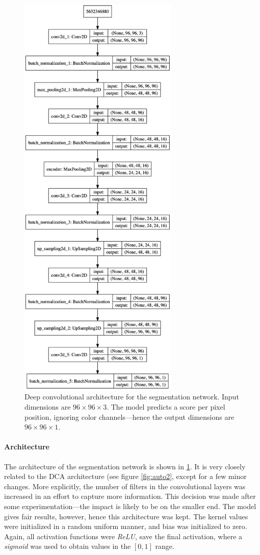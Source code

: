\begin{figure}[!htbp]
  \begin{center}
    \includegraphics[height=20cm, keepaspectratio]{images/segm_architecture}
    \caption{Deep convolutional architecture for the segmentation network. Input dimensions are $96 \times 96 \times 3$. The model predicts a score per pixel position, ignoring color channels---hence the output dimensions are $96 \times 96 \times 1$.}
    \label{fig:segm_architecture}
  \end{center}
\end{figure}

\paragraph{Architecture} The architecture of the segmentation network is shown in \ref{fig:segm_architecture}. It is very closely related to the DCA architecture (see figure \textcolor{blue}{\ref{fig:auto2}}, except for a few minor changes. More explicitly, the number of filters in the convolutional layers was increased in an effort to capture more information. This decision was made after some experimentation---the impact is likely to be on the smaller end. The model gives fair results, however, hence this architecture was kept. The kernel values were initialized in a random uniform manner, and bias was initialized to zero. Again, all activation functions were \textit{ReLU}, save the final activation, where a \textit{sigmoid} was used to obtain values in the $[0,1]$ range.

